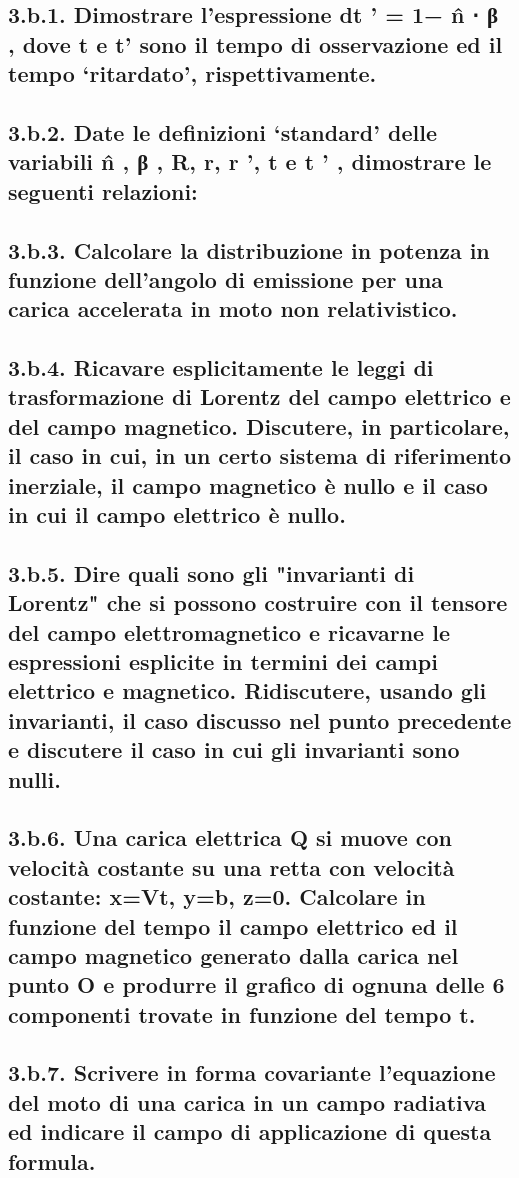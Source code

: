 \subsection*{3.b.1. Dimostrare l’espressione dt ' = 1− n̂ ⋅ β , dove t e t’ sono il tempo di osservazione ed il tempo ‘ritardato’, rispettivamente.}

\subsection*{3.b.2. Date le definizioni ‘standard’ delle variabili n̂ , β , R, r, r ', t e t ' , dimostrare le seguenti relazioni:}

\subsection*{3.b.3. Calcolare la distribuzione in potenza in funzione dell’angolo di emissione per una carica accelerata in moto non relativistico.}

\subsection*{3.b.4. Ricavare esplicitamente le leggi di trasformazione di Lorentz del campo elettrico e del campo magnetico. Discutere, in particolare, il caso in cui, in un certo sistema di riferimento inerziale, il campo magnetico è nullo e il caso in cui il campo elettrico è nullo.}

\subsection*{3.b.5. Dire quali sono gli "invarianti di Lorentz" che si possono costruire con il tensore del campo elettromagnetico e ricavarne le espressioni esplicite in termini dei campi elettrico e magnetico. Ridiscutere, usando gli invarianti, il caso discusso nel punto precedente e discutere il caso in cui gli invarianti sono nulli.}

\subsection*{3.b.6. Una carica elettrica Q si muove con velocità costante su una retta con velocità costante: x=Vt, y=b, z=0. Calcolare in funzione del tempo il campo elettrico ed il campo magnetico generato dalla carica nel punto O e produrre il grafico di ognuna delle 6 componenti trovate in funzione del tempo t.}

\subsection*{3.b.7. Scrivere in forma covariante l'equazione del moto di una carica in un campo radiativa ed indicare il campo di applicazione di questa formula.}


